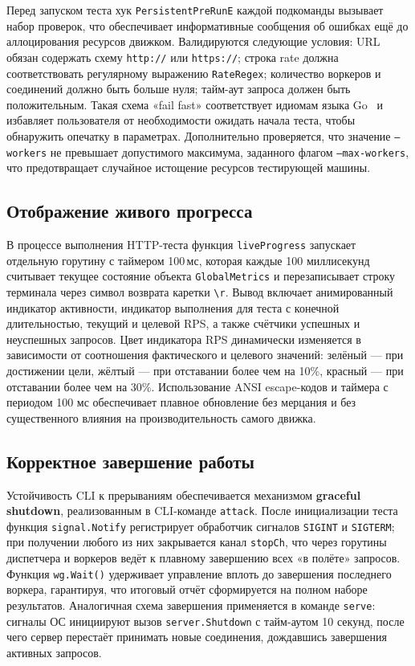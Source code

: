 Перед запуском теста хук \texttt{PersistentPreRunE} каждой подкоманды вызывает набор проверок, что обеспечивает информативные сообщения об ошибках ещё до аллоцирования ресурсов движком.
Валидируются следующие условия: URL обязан содержать схему \texttt{http://} или \texttt{https://}; строка rate должна соответствовать регулярному выражению \texttt{RateRegex}; количество воркеров и соединений должно быть больше нуля; тайм-аут запроса должен быть положительным.
Такая схема «fail fast» соответствует идиомам языка Go~\cite{gospec} и избавляет пользователя от необходимости ожидать начала теста, чтобы обнаружить опечатку в параметрах.
Дополнительно проверяется, что значение \texttt{--workers} не превышает допустимого максимума, заданного флагом \texttt{--max-workers}, что предотвращает случайное истощение ресурсов тестирующей машины.

\subsection*{Отображение живого прогресса}

В процессе выполнения HTTP-теста функция \texttt{liveProgress} запускает отдельную горутину с таймером 100\,мс, которая каждые 100 миллисекунд считывает текущее состояние объекта \texttt{GlobalMetrics} и перезаписывает строку терминала через символ возврата каретки \texttt{\textbackslash r}.
Вывод включает анимированный индикатор активности, индикатор выполнения для теста с конечной длительностью, текущий и целевой RPS, а также счётчики успешных и неуспешных запросов.
Цвет индикатора RPS динамически изменяется в зависимости от соотношения фактического и целевого значений: зелёный --- при достижении цели, жёлтый --- при отставании более чем на 10\%, красный --- при отставании более чем на 30\%.
Использование ANSI escape-кодов и таймера с периодом 100 мс обеспечивает плавное обновление без мерцания и без существенного влияния на производительность самого движка.

\subsection*{Корректное завершение работы}

Устойчивость CLI к прерываниям обеспечивается механизмом \textbf{graceful shutdown}, реализованным в CLI-команде \texttt{attack}.
После инициализации теста функция \texttt{signal.Notify} регистрирует обработчик сигналов \texttt{SIGINT} и \texttt{SIGTERM}; при получении любого из них закрывается канал \texttt{stopCh}, что через горутины диспетчера и воркеров ведёт к плавному завершению всех «в полёте» запросов.
Функция \texttt{wg.Wait()} удерживает управление вплоть до завершения последнего воркера, гарантируя, что итоговый отчёт сформируется на полном наборе результатов.
Аналогичная схема завершения применяется в команде \texttt{serve}: сигналы ОС инициируют вызов \texttt{server.Shutdown} с тайм-аутом 10 секунд, после чего сервер перестаёт принимать новые соединения, дождавшись завершения активных запросов.

